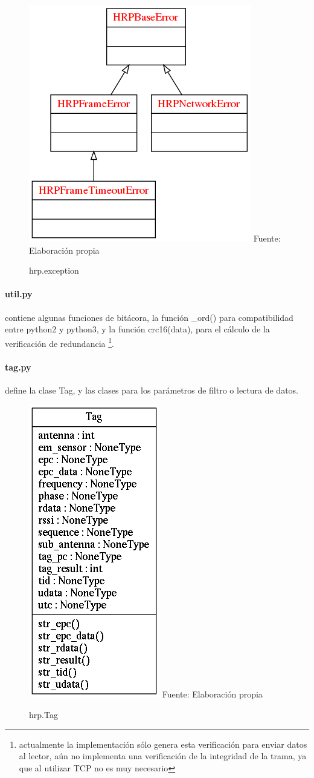 \documentclass[fleqn,10pt]{SelfArx} %
\begin{document}
\begin{figure}[ht]
\caption{hrp.exception}
\centering
\includegraphics[width=0.6\linewidth]{classes_HRP_exception.png}
\newline Fuente: Elaboración propia
\label{fig:hrp_exception}
\end{figure}

\paragraph {util.py} contiene algunas funciones de bitácora, la función \_ord() para compatibilidad entre python2 y python3, y la función crc16(data), para el cálculo de la verificación de redundancia \footnote{actualmente la implementación sólo genera esta verificación para enviar datos al lector, aún no implementa una verificación de la integridad de la trama, ya que al utilizar TCP no es muy necesario}.

\paragraph{tag.py} define la clase Tag, y las clases para los parámetros de filtro o lectura de datos.

\begin{figure}[ht]
\caption{hrp.Tag}
\centering
\includegraphics[width=0.35\linewidth]{classes_HRP_tag.png}
\newline Fuente: Elaboración propia
\label{fig:hrp_tag}
\end{figure}
\end{document}
